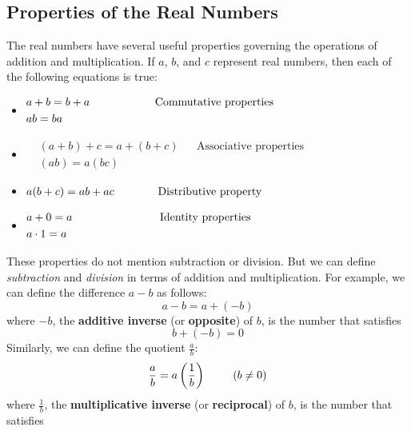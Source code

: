 \documentclass[10pt,]{book}
\newcommand{\terminology}[1]{\textbf{#1}}
\theoremstyle{plain}
\theoremstyle{definition}
\theoremstyle{definition}
\theoremstyle{definition}
\numberwithin{equation}{part}
\newcommand{\amp}{&}
\begin{document}
\subsection[{Properties of the Real Numbers}]{Properties of the Real Numbers}\label{subsection-62}
The real numbers have several useful properties governing the operations of addition and multiplication. If \(a\), \(b\), and \(c\) represent real numbers, then each of the following equations is true: \leavevmode%
\begin{itemize}[label=\textbullet]
\item{}\(\begin{aligned}
\amp a + b = b + a \amp\amp\hphantom{blankblank}\text{Commutative properties}\\
\amp ab = ba
\end{aligned}\)%
\item{}\(\begin{aligned}
\amp (a + b)+c = a+(b+c) \amp\amp\text{Associative properties}\\
\amp (ab) = a(bc)
\end{aligned}\)%
\item{}\(\begin{aligned}
\amp a(b+c) = ab+ac \amp\amp\hphantom{blank0}\text{Distributive property}
\end{aligned}\)%
\item{}\(\begin{aligned}
\amp a + 0 = a \amp\amp\hphantom{blankblank0000}\text{Identity properties}\\
\amp a\cdot 1 = a
\end{aligned}\)%
\end{itemize}
%
\par
These properties do not mention subtraction or division. But we can define \emph{subtraction} and \emph{division} in terms of addition and multiplication. For example, we can define the difference \(a-b\) as follows:%
\begin{equation*}
a − b = a + (−b)
\end{equation*}
where \(-b\), the \terminology{additive inverse} (or \terminology{opposite}) of \(b\), is the number that satisfies%
\begin{equation*}
b + (−b) = 0
\end{equation*}
Similarly, we can define the quotient \(\frac{a}{b}\):%
\begin{equation*}
\frac{a}{b}=a\left(\frac{1}{b} \right) \hphantom{blank} (b\ne 0) 
\end{equation*}
where \(\frac{1}{b} \), the \terminology{multiplicative inverse} (or \terminology{reciprocal}) of \(b\), is the number that satisfies%
\end{document}
